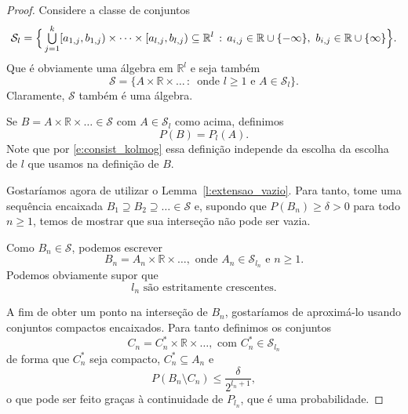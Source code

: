 \begin{proof}
  Considere a classe de conjuntos
  \begin{equation*}
    \mathcal{S}_l = \Big\{ \operatorname*{{\textstyle \bigcup}}_{j=1}^k [a_{1,j}, b_{1,j}) \times \dots \times [a_{l,j}, b_{l,j}) \subseteq \mathbb{R}^l \, : \,
    a_{i,j} \in \mathbb{R} \cup \{-\infty\},\ b_{i,j} \in \mathbb{R} \cup \{\infty\} \Big\}.
  \end{equation*}
  Que é obviamente uma álgebra em $\mathbb{R}^l$ e seja também
  \begin{equation}
    \mathcal{S} = \big\{ A \times \mathbb{R} \times \dots\, : \, \text{ onde } l \geq 1 \text{ e } A \in \mathcal{S}_l \big\}.
  \end{equation}
  Claramente, $\mathcal{S}$ também é uma álgebra.

  Se $B = A \times \mathbb{R} \times \dots \in \mathcal{S}$ com $A \in \mathcal{S}_l$ como acima, definimos
  \begin{equation}
    P(B) = P_l(A).
  \end{equation}
  Note que por \eqref{e:consist_kolmog} essa definição independe da escolha da escolha de $l$ que usamos na definição de $B$.

  Gostaríamos agora de utilizar o Lemma~\ref{l:extensao_vazio}.
  Para tanto, tome uma sequência encaixada $B_1 \supseteq B_2 \supseteq \dots \in \mathcal{S}$ e, supondo que $P(B_n) \geq \delta > 0$ para todo $n \geq 1$, temos de mostrar que sua interseção não pode ser vazia.

  Como $B_n \in \mathcal{S}$, podemos escrever
  \begin{equation}
    B_n = A_n \times \mathbb{R} \times \dots, \text{ onde $A_n \in \mathcal{S}_{l_n}$ e $n \geq 1$.}
  \end{equation}
  Podemos obviamente supor que
  \begin{equation}
    \label{e:l_n_monotona}
    \text{$l_n$ são estritamente crescentes.}
  \end{equation}

  A fim de obter um ponto na interseção de $B_n$, gostaríamos de aproximá-lo usando conjuntos compactos encaixados.
  Para tanto definimos os conjuntos
  \begin{equation}
    C_n = C_n^* \times \mathbb{R} \times \dots, \text{ com $C_n^* \in \mathcal{S}_{l_n}$}
  \end{equation}
  de forma que $C_n^*$ seja compacto, $C_n^* \subseteq A_n$ e
  \begin{equation}
    P(B_n \setminus C_n) \leq \frac{\delta}{2^{l_n + 1}},
  \end{equation}
  o que pode ser feito graças à continuidade de $P_{l_n}$, que é uma probabilidade.


\end{proof}
